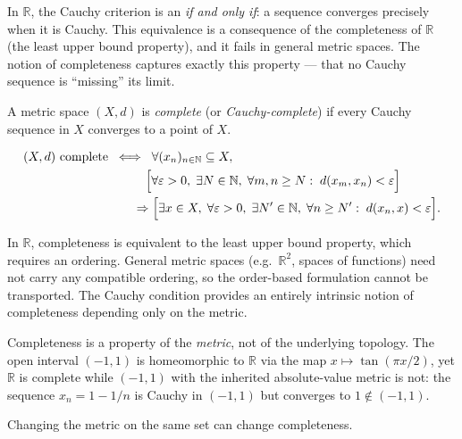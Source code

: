 In $\mathbb{R}$, the Cauchy criterion is an \emph{if and only if}: a
sequence converges precisely when it is Cauchy.
This equivalence is a consequence of the completeness of $\mathbb{R}$
(the least upper bound property), and it fails in general metric spaces.
The notion of completeness captures exactly this property --- that no
Cauchy sequence is ``missing'' its limit.

\begin{tcolorbox}[colback=propbox, colframe=propborder, arc=2pt,
  left=6pt, right=6pt, top=4pt, bottom=4pt,
  title={\small\textbf{Definition (Complete Metric Space)}},
  fonttitle=\small\bfseries]
\begin{definition}
\label{def:complete-metric-space}
A metric space $(X,d)$ is \emph{complete} (or \emph{Cauchy-complete})
if every Cauchy sequence in $X$ converges to a point of $X$.
\end{definition}
\end{tcolorbox}

\begin{remark*}
\begin{align*}
(X,d)\ \text{complete}
&\;\iff\;
\forall (x_n)_{n\in\mathbb{N}} \subseteq X, \\
&\qquad\quad
\Bigl[
  \forall \varepsilon > 0,\;
  \exists N \in \mathbb{N},\;
  \forall m,n \ge N:\;
  d(x_m,x_n) < \varepsilon
\Bigr] \\
&\qquad\Rightarrow
\Bigl[
  \exists x \in X,\;
  \forall \varepsilon > 0,\;
  \exists N' \in \mathbb{N},\;
  \forall n \ge N':\;
  d(x_n,x) < \varepsilon
\Bigr].
\end{align*}
\end{remark*}

\begin{remark*}
In $\mathbb{R}$, completeness is equivalent to the least upper bound
property, which requires an ordering.
General metric spaces (e.g.\ $\mathbb{R}^2$, spaces of functions) need
not carry any compatible ordering, so the order-based formulation
cannot be transported.
The Cauchy condition provides an entirely intrinsic notion of
completeness depending only on the metric.
\end{remark*}

\begin{remark*}
Completeness is a property of the \emph{metric}, not of the underlying
topology.
The open interval $(-1,1)$ is homeomorphic to $\mathbb{R}$ via the map
$x \mapsto \tan(\pi x/2)$, yet $\mathbb{R}$ is complete while
$(-1,1)$ with the inherited absolute-value metric is not: the sequence
$x_n = 1 - 1/n$ is Cauchy in $(-1,1)$ but converges to $1 \notin (-1,1)$.

Changing the metric on the same set can change completeness.
\end{remark*}

